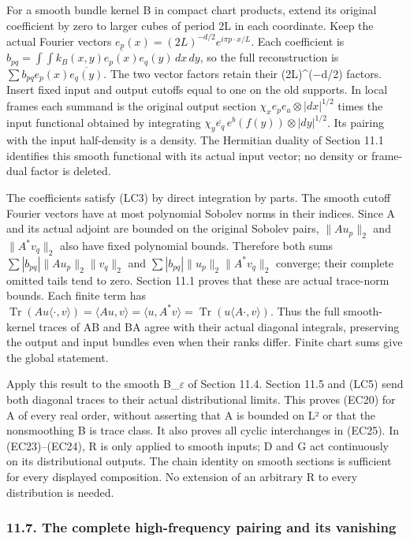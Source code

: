 \documentclass[
  11pt,
]{article}
\begin{document}
For a smooth bundle kernel B in compact chart products, extend its
original coefficient by zero to larger cubes of period 2L in each
coordinate. Keep the actual Fourier vectors
\(e_p(x)=(2L)^{-d/2}e^{i\pi p\cdot x/L}\). Each coefficient is
\(b_{pq}=\int\int k_B(x,y)\overline{e_p(x)}e_q(y)\,dx\,dy\), so the full
reconstruction is \(\sum b_{pq}e_p(x)\overline{e_q(y)}\). The two vector
factors retain their (2L)\^{}(−d/2) factors. Insert fixed input and
output cutoffs equal to one on the old supports. In local frames each
summand is the original output section
\(\chi_x e_p e_a\otimes|dx|^{1/2}\) times the input functional obtained
by integrating \(\chi_y\overline{e_q}\,e^b(f(y))\otimes|dy|^{1/2}\). Its
pairing with the input half-density is a density. The Hermitian duality
of Section 11.1 identifies this smooth functional with its actual input
vector; no density or frame-dual factor is deleted.

The coefficients satisfy (LC3) by direct integration by parts. The
smooth cutoff Fourier vectors have at most polynomial Sobolev norms in
their indices. Since A and its actual adjoint are bounded on the
original Sobolev pairs, \(\|Au_p\|_2\) and \(\|A^*v_q\|_2\) also have
fixed polynomial bounds. Therefore both sums
\(\sum|b_{pq}|\|Au_p\|_2\|v_q\|_2\) and
\(\sum|b_{pq}|\|u_p\|_2\|A^*v_q\|_2\) converge; their complete omitted
tails tend to zero. Section 11.1 proves that these are actual trace-norm
bounds. Each finite term has
\(\operatorname{Tr}(Au\langle\cdot,v\rangle)=\langle Au,v\rangle
=\langle u,A^*v\rangle
=\operatorname{Tr}(u\langle A\cdot,v\rangle)\). Thus the full
smooth-kernel traces of AB and BA agree with their actual diagonal
integrals, preserving the output and input bundles even when their ranks
differ. Finite chart sums give the global statement.

Apply this result to the smooth B\_\ensuremath{\varepsilon} of Section 11.4. Section 11.5 and
(LC5) send both diagonal traces to their actual distributional limits.
This proves (EC20) for A of every real order, without asserting that A
is bounded on L² or that the nonsmoothing B is trace class. It also
proves all cyclic interchanges in (EC25). In (EC23)--(EC24), R is only
applied to smooth inputs; D and G act continuously on its distributional
outputs. The chain identity on smooth sections is sufficient for every
displayed composition. No extension of an arbitrary R to every
distribution is needed.

\subsubsection{11.7. The complete high-frequency pairing and its
vanishing}\label{the-complete-high-frequency-pairing-and-its-vanishing}
\end{document}
